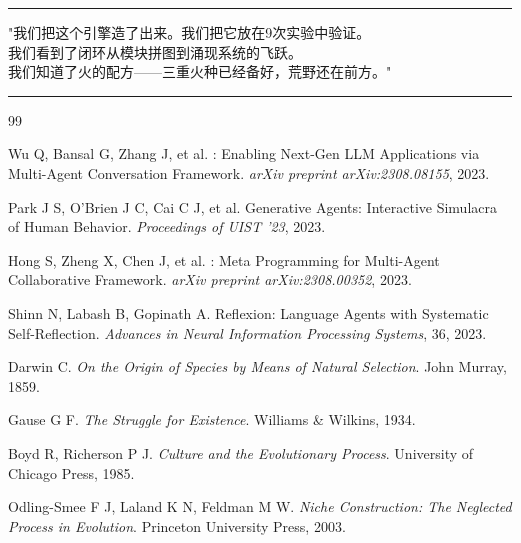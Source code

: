 \documentclass[12pt,a4paper]{ctexart}
\begin{document}
\vspace{12pt}
\hrule
\vspace{8pt}

\begin{center}
{\kaishu "我们把这个引擎造了出来。我们把它放在9次实验中验证。\\
我们看到了闭环从模块拼图到涌现系统的飞跃。\\
我们知道了火的配方——三重火种已经备好，荒野还在前方。"}
\end{center}

\vspace{4pt}
\hrule

\newpage
\begin{thebibliography}{99}

Wu Q, Bansal G, Zhang J, et al.
: Enabling Next-Gen LLM Applications via Multi-Agent Conversation Framework.
\newblock \emph{arXiv preprint arXiv:2308.08155}, 2023.

Park J S, O'Brien J C, Cai C J, et al.
\newblock Generative Agents: Interactive Simulacra of Human Behavior.
\newblock \emph{Proceedings of UIST '23}, 2023.

Hong S, Zheng X, Chen J, et al.
: Meta Programming for Multi-Agent Collaborative Framework.
\newblock \emph{arXiv preprint arXiv:2308.00352}, 2023.

Shinn N, Labash B, Gopinath A.
\newblock Reflexion: Language Agents with Systematic Self-Reflection.
\newblock \emph{Advances in Neural Information Processing Systems}, 36, 2023.

Darwin C.
\newblock \emph{On the Origin of Species by Means of Natural Selection}.
\newblock John Murray, 1859.

Gause G F.
\newblock \emph{The Struggle for Existence}.
\newblock Williams \& Wilkins, 1934.

Boyd R, Richerson P J.
\newblock \emph{Culture and the Evolutionary Process}.
\newblock University of Chicago Press, 1985.

Odling-Smee F J, Laland K N, Feldman M W.
\newblock \emph{Niche Construction: The Neglected Process in Evolution}.
\newblock Princeton University Press, 2003.


\end{thebibliography}
\end{document}
